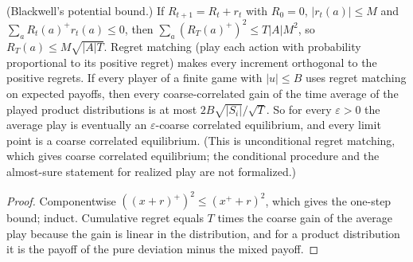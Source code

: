 \begin{theorem}
\label{thm:beh-regret-matching}
\leanok
{}
(Blackwell's potential bound.) If $R_{t+1}=R_t+r_t$ with $R_0=0$, $|r_t(a)|\le M$ and $\sum_aR_t(a)^+r_t(a)\le0$, then
$\sum_a(R_T(a)^+)^2\le T|A|M^2$, so $R_T(a)\le M\sqrt{|A|T}$. Regret matching (play each action with probability
proportional to its positive regret) makes every increment orthogonal to the positive regrets. If every player of a
finite game with $|u|\le B$ uses regret matching on expected payoffs, then every coarse-correlated gain of the time
average of the played product distributions is at most $2B\sqrt{|S_i|}/\sqrt T$. So for every $\varepsilon>0$ the
average play is eventually an $\varepsilon$-coarse correlated equilibrium, and every limit point is a coarse
correlated equilibrium. (This is unconditional regret matching, which gives coarse correlated equilibrium; the
conditional procedure and the almost-sure statement for realized play are not formalized.)
\end{theorem}
\begin{proof}
\leanok
Componentwise $((x+r)^+)^2\le(x^++r)^2$, which gives the one-step bound; induct. Cumulative regret equals $T$ times the
coarse gain of the average play because the gain is linear in the distribution, and for a product distribution it is
the payoff of the pure deviation minus the mixed payoff.
\end{proof}

